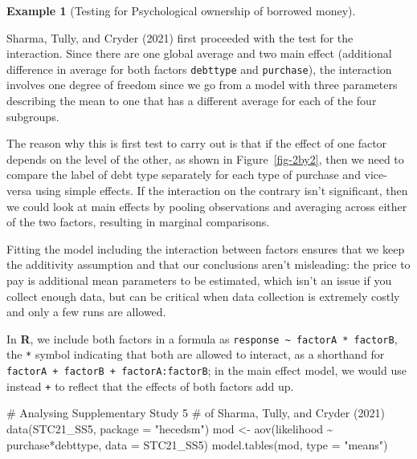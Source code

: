 \documentclass[
  11pt,
  letterpaper,
]{scrbook}
\newenvironment{Shaded}{\begin{snugshade}}{\end{snugshade}}
\newcommand{\AttributeTok}[1]{\textcolor[rgb]{0.40,0.45,0.13}{#1}}
\newcommand{\CommentTok}[1]{\textcolor[rgb]{0.37,0.37,0.37}{#1}}
\newcommand{\FunctionTok}[1]{\textcolor[rgb]{0.28,0.35,0.67}{#1}}
\newcommand{\NormalTok}[1]{\textcolor[rgb]{0.00,0.23,0.31}{#1}}
\newcommand{\OtherTok}[1]{\textcolor[rgb]{0.00,0.23,0.31}{#1}}
\newcommand{\SpecialCharTok}[1]{\textcolor[rgb]{0.37,0.37,0.37}{#1}}
\newcommand{\StringTok}[1]{\textcolor[rgb]{0.13,0.47,0.30}{#1}}
\theoremstyle{definition}
\theoremstyle{definition}
\newtheorem{example}{Example}[chapter]
\theoremstyle{remark}
\begin{document}
\begin{example}[Testing for Psychological ownership of borrowed
money]\protect\hypertarget{exm-borrowed-money-test}{}\label{exm-borrowed-money-test}

Sharma, Tully, and Cryder (2021) first proceeded with the test for the
interaction. Since there are one global average and two main effect
(additional difference in average for both factors \texttt{debttype} and
\texttt{purchase}), the interaction involves one degree of freedom since
we go from a model with three parameters describing the mean to one that
has a different average for each of the four subgroups.

The reason why this is first test to carry out is that if the effect of
one factor depends on the level of the other, as shown in
Figure~\ref{fig-2by2}, then we need to compare the label of debt type
separately for each type of purchase and vice-versa using simple
effects. If the interaction on the contrary isn't significant, then we
could look at main effects by pooling observations and averaging across
either of the two factors, resulting in marginal comparisons.

Fitting the model including the interaction between factors ensures that
we keep the additivity assumption and that our conclusions aren't
misleading: the price to pay is additional mean parameters to be
estimated, which isn't an issue if you collect enough data, but can be
critical when data collection is extremely costly and only a few runs
are allowed.

In \textbf{R}, we include both factors in a formula as
\texttt{response\ \textasciitilde{}\ factorA\ *\ factorB}, the
\texttt{*} symbol indicating that both are allowed to interact, as a
shorthand for \texttt{factorA\ +\ factorB\ +\ factorA:factorB}; in the
main effect model, we would use instead \texttt{+} to reflect that the
effects of both factors add up.

\begin{Shaded}
\begin{Highlighting}[]
\CommentTok{\# Analysing Supplementary Study 5}
\CommentTok{\# of Sharma, Tully, and Cryder (2021)}
\FunctionTok{data}\NormalTok{(STC21\_SS5, }\AttributeTok{package =} \StringTok{"hecedsm"}\NormalTok{)}
\NormalTok{mod }\OtherTok{\textless{}{-}} \FunctionTok{aov}\NormalTok{(likelihood }\SpecialCharTok{\textasciitilde{}}\NormalTok{ purchase}\SpecialCharTok{*}\NormalTok{debttype, }
           \AttributeTok{data =}\NormalTok{ STC21\_SS5)}
\FunctionTok{model.tables}\NormalTok{(mod, }\AttributeTok{type =} \StringTok{"means"}\NormalTok{)}
\end{Highlighting}
\end{Shaded}


\end{example}
\end{document}
